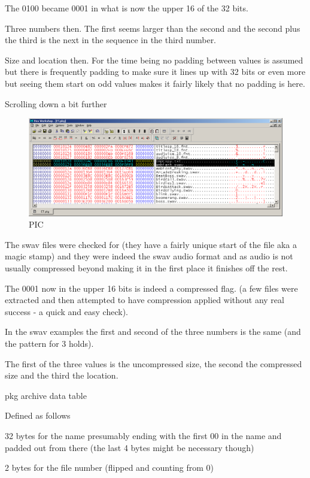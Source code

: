 \documentclass[
]{book}
\begin{document}
The 0100 became 0001 in what is now the upper 16 of the 32 bits.

Three numbers then. The first seems larger than the second and the second plus the third is the next in the sequence in the third number.

Size and location then. For the time being no padding between values is assumed but there is frequently padding to make sure it lines up with 32 bits or even more but seeing them start on odd values makes it fairly likely that no padding is here.

Scrolling down a bit further

\begin{figure}
\centering
\includegraphics{images/130_home_fast6191_romhackingguide_unrenamed_fil___al_borders_romhackingguidearchive_eltigre_4.png}
\caption{PIC}
\end{figure}

The swav files were checked for (they have a fairly unique start of the file aka a magic stamp) and they were indeed the swav audio format and as audio is not usually compressed beyond making it in the first place it finishes off the rest.

The 0001 now in the upper 16 bits is indeed a compressed flag. (a few files were extracted and then attempted to have compression applied without any real success - a quick and easy check).

In the swav examples the first and second of the three numbers is the same (and the pattern for 3 holds).

The first of the three values is the uncompressed size, the second the compressed size and the third the location.

pkg archive data table

Defined as follows

32 bytes for the name presumably ending with the first 00 in the name and padded out from there (the last 4 bytes might be necessary though)

2 bytes for the file number (flipped and counting from 0)
\end{document}
